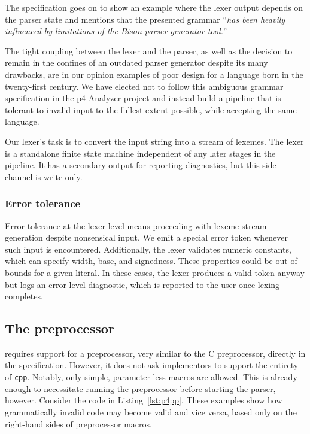 The specification goes on to show an example where the lexer output depends on
the parser state and mentions that the presented grammar ``\textit{has been heavily
influenced by limitations of the Bison parser generator tool.}''

The tight coupling between the lexer and the parser, as well as the decision to
remain in the confines of an outdated parser generator despite its many
drawbacks, are in our opinion examples of poor design for a language born in the
twenty-first century. We have elected not to follow this ambiguous grammar
specification in the \acrshort{p4} Analyzer project and instead build a pipeline
that is tolerant to invalid input to the fullest extent possible, while
accepting the same language.

Our lexer's task is to convert the input string into a stream of lexemes. The
lexer is a standalone finite state machine independent of any later stages in
the pipeline. It has a secondary output for reporting diagnostics, but this side
channel is write-only.

\subsubsection*{Error tolerance}

Error tolerance at the lexer level means proceeding with lexeme stream
generation despite nonsensical input. We emit a special error token whenever
such input is encountered. Additionally, the lexer validates numeric constants,
which can specify width, base, and signedness. These
properties could be out of bounds for a given literal. In these cases, the lexer
produces a valid token anyway but logs an error-level diagnostic, which is
reported to the user once lexing completes.


\subsection{The preprocessor}

\pfs requires support for a preprocessor, very similar to the C preprocessor,
directly in the specification. However, it does not ask implementors to support
the entirety of \texttt{cpp}. Notably, only simple, parameter-less macros are
allowed. This is already enough to necessitate running the preprocessor before
starting the parser, however. Consider the code in
Listing~\ref{lst:p4pp}. These examples show how
grammatically invalid code may become valid and vice versa, based only on the
right-hand sides of preprocessor macros.

